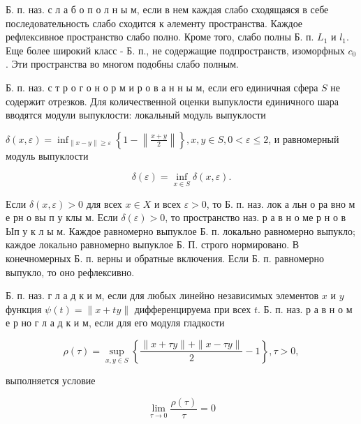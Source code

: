 \documentclass[10pt]{article}
\begin{document}
Б. п. наз. с л а б о п о л н ы м, если в нем каждая слабо сходящаяся в себе последовательность слабо сходится к әлементу пространства. Каждое рефлексивное пространство слабо полно. Кроме того, слабо полны Б. п. $L_{1}$ и $l_{1}$. Еще более широкий класс - Б. п., не содержащие подпространств, изоморфных $c_{0}$. Эти пространства во многом подобны слабо полным.



Б. п. наз. с т р о г о н о р м и р о в а н н ы м, если его единичная сфера $S$ не содержит отрезков. Для количественной оценки выпуклости единичного шара вводятся модули выпуклости: локальный модуль выпуклости



$\delta(x, \varepsilon)=\inf _{\|x-y\| \geqslant \varepsilon}\left\{1-\left\|\frac{x+y}{2}\right\|\right\}, x, y \in S, 0<\varepsilon \leqslant 2$, и равномерный модуль выпуклости



\[

\delta(\varepsilon)=\inf _{x \in S} \delta(x, \varepsilon) .

\]



Если $\delta(x, \varepsilon)>0$ для всех $x \in X$ и всех $\varepsilon>0$, то Б. п. наз. лок а льн о ра вно м е рн о вы п у клы м. Если $\delta(\varepsilon)>0$, то пространство наз. р а в н о ме р н о в Ып у к л ы м. Каждое равномерно выпуклое Б. п. локально равномерно выпукло; каждое локально равномерно выпуклое Б. П. строго нормировано. В конечномерных Б. п. верны и обратные включения. Если Б. п. равномерно выпукло, то оно рефлексивно.



Б. п. наз. г л а д к и м, если для любых линейно независимых элементов $x$ и $y$ функция $\psi(t)=\|x+t y\|$ дифференцируема при всех $t$. Б. п. наз. р а в н о м е р но г л а д к и м, если для его модуля гладкости



\[

\rho(\tau)=\sup _{x, y \in S}\left\{\frac{\|x+\tau y\|+\|x-\tau y\|}{2}-1\right\}, \tau>0,

\]



выполняется условие



\[

\lim _{\tau \rightarrow 0} \frac{\rho(\tau)}{\tau}=0

\]
\end{document}
